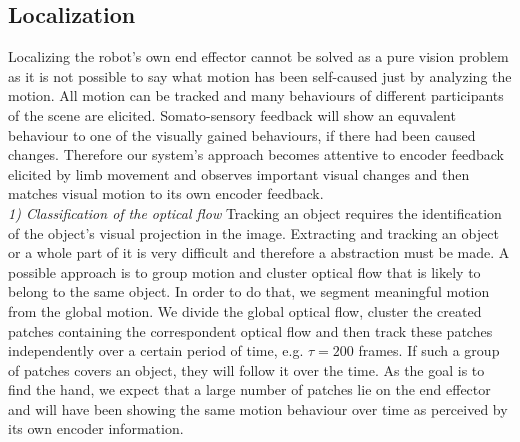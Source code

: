 \subsection{Localization}\label{method:localization}
Localizing the robot's own end effector cannot be solved as a pure vision problem 
as it is not possible to say what motion has been self-caused just by analyzing the 
motion. All motion can be tracked and many behaviours of different participants of 
the scene are elicited. Somato-sensory feedback will show an equvalent behaviour to 
one of the visually gained behaviours, if there had been caused changes. Therefore 
our system's approach becomes attentive to encoder feedback elicited by limb movement 
and observes important visual changes and then matches visual motion to its own 
encoder feedback.\\ \newline
%
\textit{1) Classification of the optical flow}\newline%
Tracking an object requires the identification of the object's visual projection in the image. Extracting and tracking an object or a whole part of it is very difficult and therefore a abstraction must be made. A possible approach is to group motion and cluster optical flow that is likely to belong to the same object. In order to do that, we segment meaningful motion from the global motion. We divide the global optical flow, cluster the created patches containing the correspondent optical flow and then track these patches independently over a certain period of time, e.g. $\tau = 200$ frames. If such a group of patches covers an object, they will follow it over the time. As the goal is to find the hand, we expect that a large number of patches lie on the end effector and will have been showing the same motion behaviour over time as perceived by its own encoder information.\\ \newline
